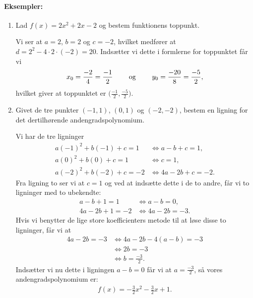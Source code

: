 \paragraph*{Eksempler:}
\begin{enumerate}
\item Lad $f(x)= 2x^2+2x-2$ og bestem funktionens toppunkt.

Vi ser at $a=2$, $b=2$ og $c=-2$, hvilket medfører at $d=2^2-4 \cdot 2 \cdot (-2)=20$. Indsætter vi dette i formlerne for toppunktet får vi
\begin{align*}
x_0 = \frac{-2}{4} = \frac{-1}{2} \qquad \textup{ og } \qquad y_0 = \frac{-20}{8}=\frac{-5}{2},
\end{align*}
hvilket giver at toppunktet er $\big(\frac{-1}{2},\frac{-5}{2}\big)$.
\item Givet de tre punkter $(-1,1)$, $(0,1)$ og $(-2,-2)$, bestem en ligning for det dertilhørende andengradspolynomium.

Vi har de tre ligninger
\begin{align*}
a(-1)^2+b(-1) + c = 1 &\Leftrightarrow a-b+c=1,\\
a(0)^2+b(0) + c = 1 &\Leftrightarrow c=1,\\
a(-2)^2+b(-2) + c = -2 &\Leftrightarrow 4a-2b +c = -2.
\end{align*}
Fra ligning to ser vi at $c=1$ og ved at indsætte dette i de to andre, får vi to ligninger med to ubekendte:
\begin{align*}
a-b+1=1 &\Leftrightarrow a-b=0, \\
4a-2b+1=-2 &\Leftrightarrow 4a-2b = -3.
\end{align*}
Hvis vi benytter de lige store koefficienters metode til at løse disse to ligninger, får vi at
\begin{align*}
4a-2b = -3 &\Leftrightarrow 4a - 2b -4(a-b) = -3 \\
&\Leftrightarrow 2b = -3 \\
&\Leftrightarrow b = \frac{-3}{2}.
\end{align*}
Indsætter vi nu dette i ligningen $a-b=0$ får vi at $a=\frac{-3}{2}$, så vores andengradspolynomium er:
\begin{align*}
f(x)=-\frac{3}{2}x^2 -\frac{3}{2}x+1.
\end{align*}
\end{enumerate}












